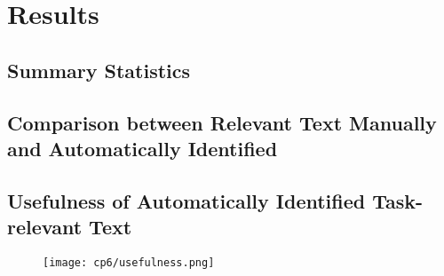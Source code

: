 
\section{Results}
\label{cp6:results}



\subsection{Summary Statistics}






\subsection{Comparison between Relevant Text Manually and Automatically Identified}






\subsection{Usefulness of Automatically Identified Task-relevant Text}




\begin{figure}[b!]
    \centering
    \texttt{[image: cp6/usefulness.png]}
\end{figure}